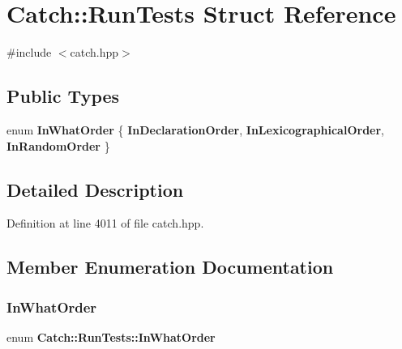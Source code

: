 \section{Catch\+::Run\+Tests Struct Reference}
\label{struct_catch_1_1_run_tests}


{\ttfamily \#include $<$catch.\+hpp$>$}

\subsection*{Public Types}
\begin{DoxyCompactItemize}
\item 
enum \textbf{ In\+What\+Order} \{ \textbf{ In\+Declaration\+Order}, 
\textbf{ In\+Lexicographical\+Order}, 
\textbf{ In\+Random\+Order}
 \}
\end{DoxyCompactItemize}


\subsection{Detailed Description}


Definition at line 4011 of file catch.\+hpp.



\subsection{Member Enumeration Documentation}
\mbox{\label{struct_catch_1_1_run_tests_ab56bd851b1dd085869992d1a9d73dc5d}} 
\subsubsection{InWhatOrder}
{\footnotesize\ttfamily enum \textbf{ Catch\+::\+Run\+Tests\+::\+In\+What\+Order}}

